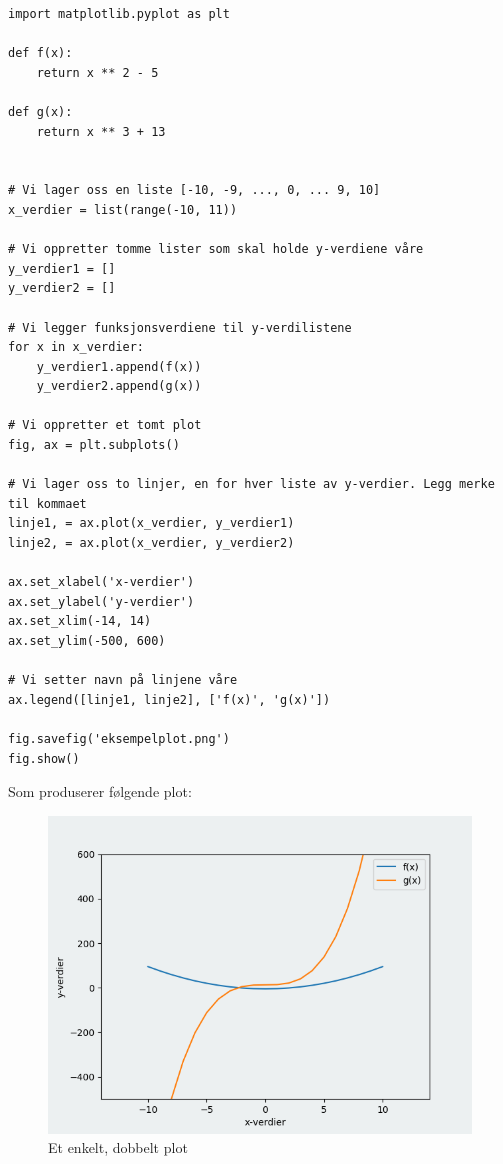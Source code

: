 \documentclass[11pt]{article}
\theoremstyle{definition}
\begin{document}
\begin{verbatim}
import matplotlib.pyplot as plt

def f(x):
    return x ** 2 - 5

def g(x):
    return x ** 3 + 13


# Vi lager oss en liste [-10, -9, ..., 0, ... 9, 10]
x_verdier = list(range(-10, 11))

# Vi oppretter tomme lister som skal holde y-verdiene våre
y_verdier1 = []
y_verdier2 = []

# Vi legger funksjonsverdiene til y-verdilistene
for x in x_verdier:
    y_verdier1.append(f(x))
    y_verdier2.append(g(x))

# Vi oppretter et tomt plot
fig, ax = plt.subplots()

# Vi lager oss to linjer, en for hver liste av y-verdier. Legg merke til kommaet
linje1, = ax.plot(x_verdier, y_verdier1)
linje2, = ax.plot(x_verdier, y_verdier2)

ax.set_xlabel('x-verdier')
ax.set_ylabel('y-verdier')
ax.set_xlim(-14, 14)
ax.set_ylim(-500, 600)

# Vi setter navn på linjene våre
ax.legend([linje1, linje2], ['f(x)', 'g(x)'])

fig.savefig('eksempelplot.png')
fig.show()
\end{verbatim}

Som produserer følgende plot: 

\begin{figure}[htbp]
\centering
\includegraphics[width=.9\linewidth]{../figurer/uke42_eksempelplot.png}
\caption{Et enkelt, dobbelt plot}
\end{figure}
\end{document}
